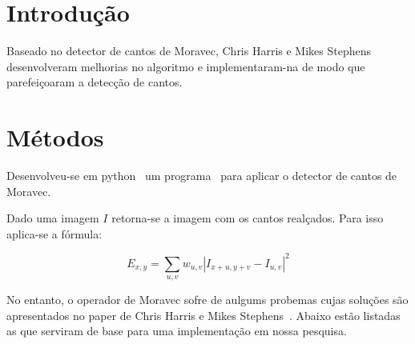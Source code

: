 \documentclass[10pt,a4paper]{article}
\begin{document}
\vspace{2mm}
\newpage

\section{Introdução}

Baseado no detector de cantos de Moravec, Chris Harris e
Mikes Stephens~\cite{paper} desenvolveram melhorias no algoritmo e
implementaram-na de modo que parefeiçoaram a detecção de cantos.

\section{Métodos}

Desenvolveu-se em python~\cite{python} um programa~\cite{code} para aplicar o
detector de cantos de Moravec.

Dado uma imagem $I$ retorna-se a imagem com os cantos realçados.
Para isso aplica-se a fórmula:

\begin{equation}
E_{x,y}=\sum_{u,v}w_{u,v}\left | I_{x+u,y+v}-I_{u,v}  \right |^2
\end{equation}

No entanto, o operador de Moravec sofre de aulgums probemas cujas soluções são apresentados no paper de  Chris Harris e
Mikes Stephens~\cite{paper}. Abaixo estão listadas as que serviram de
base para uma implementação  em
nossa pesquisa. 
\end{document}
